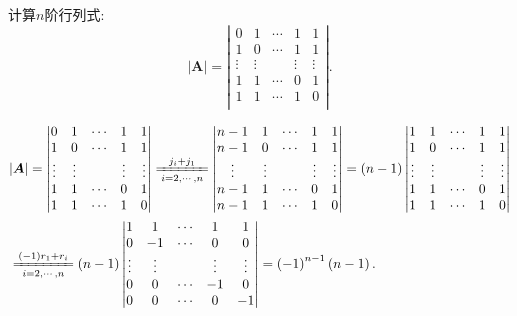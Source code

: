\documentclass[../../main.tex]{subfiles}%
\begin{document}
\begin{example}
计算$n$阶行列式:
\begin{equation}
|\boldsymbol{A}|=\left| \begin{matrix}
0&		1&		\cdots&		1&		1\\
1&		0&		\cdots&		1&		1\\
\vdots&		\vdots&		&		\vdots&		\vdots\\
1&		1&		\cdots&		0&		1\\
1&		1&		\cdots&		1&		0\\
\end{matrix} \right|.
\nonumber
\end{equation}
\begin{solution}

\begin{equation}
\begin{split}
&|\boldsymbol{A}|=\left| \begin{matrix}
0&		1&		\cdots&		1&		1\\
1&		0&		\cdots&		1&		1\\
\vdots&		\vdots&		&		\vdots&		\vdots\\
1&		1&		\cdots&		0&		1\\
1&		1&		\cdots&		1&		0\\
\end{matrix} \right|\xlongequal[i=2,\cdots ,n]{j_i+j_1}\left| \begin{matrix}
n-1&		1&		\cdots&		1&		1\\
n-1&		0&		\cdots&		1&		1\\
\vdots&		\vdots&		&		\vdots&		\vdots\\
n-1&		1&		\cdots&		0&		1\\
n-1&		1&		\cdots&		1&		0\\
\end{matrix} \right|=\left( n-1 \right) \left| \begin{matrix}
1&		1&		\cdots&		1&		1\\
1&		0&		\cdots&		1&		1\\
\vdots&		\vdots&		&		\vdots&		\vdots\\
1&		1&		\cdots&		0&		1\\
1&		1&		\cdots&		1&		0\\
\end{matrix} \right|
\\
&\xlongequal[i=2,\cdots ,n]{\left( -1 \right) r_1+r_i}\left( n-1 \right) \left| \begin{matrix}
1&		1&		\cdots&		1&		1\\
0&		-1&		\cdots&		0&		0\\
\vdots&		\vdots&		&		\vdots&		\vdots\\
0&		0&		\cdots&		-1&		0\\
0&		0&		\cdots&		0&		-1\\
\end{matrix} \right|=\left( -1 \right) ^{n-1}\left( n-1 \right) .
\end{split}
\nonumber
\end{equation}


\end{solution}
\end{example}
\end{document}
